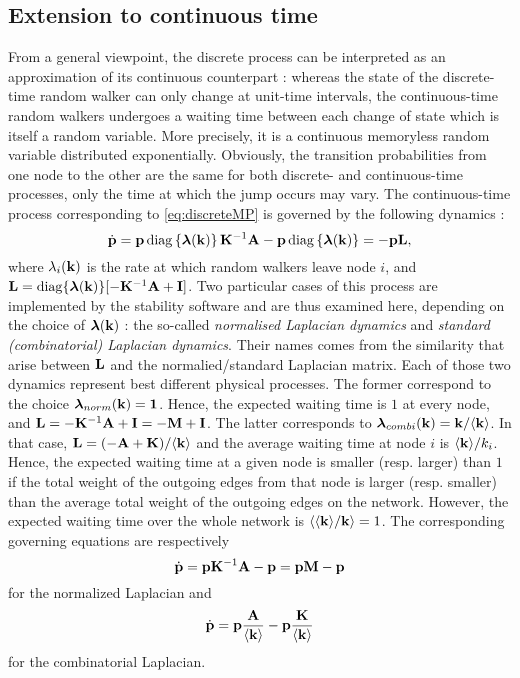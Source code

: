 \subsection{Extension to continuous time}
From a general viewpoint, the discrete process can be interpreted as an approximation of its continuous counterpart : whereas the state of the discrete-time random walker can only change at unit-time intervals, the continuous-time random walkers undergoes a waiting time between each change of state which is itself a random variable. More precisely, it is a continuous memoryless random variable distributed exponentially. Obviously, the transition probabilities from one node to the other are the same for both discrete- and continuous-time processes, only the time at which the jump occurs may vary. The continuous-time process corresponding to \eqref{eq:discreteMP} is governed by the following dynamics :
\begin{equation} \label{eq:continuousMP_general}
    	\dot{\mathbf p} = \mathbf p \operatorname{diag}\left\{\boldsymbol \lambda(\mathbf k)\right\} \mathbf K^{-1} \mathbf A - \mathbf p \operatorname{diag}\left\{\boldsymbol \lambda(\mathbf k)\right\} = -\mathbf p \mathbf L,
\end{equation}
where $\lambda_i(\mathbf k)$ is the rate at which random walkers leave node $i$, and $\mathbf L = \operatorname{diag}\{\boldsymbol \lambda(\mathbf k)\}[-\mathbf K^{-1} \mathbf A + \mathbf I]$. Two particular cases of this process are implemented by the stability software and are thus examined here, depending on the choice of $\boldsymbol \lambda(\mathbf k)$ : the so-called \textit{normalised Laplacian dynamics} and \textit{standard (combinatorial) Laplacian dynamics}. Their names comes from the similarity that arise between $\mathbf L$ and the normalied/standard Laplacian matrix. Each of those two dynamics represent best different physical processes. The former correspond to the choice $\boldsymbol \lambda_{norm}(\mathbf k) = \mathbf 1$. Hence, the expected waiting time is $1$ at every node, and $\mathbf L = -\mathbf K^{-1} \mathbf A + \mathbf I = -\mathbf M + \mathbf I$. The latter corresponds to $\boldsymbol \lambda_{combi}(\mathbf k) = \mathbf k/\langle \mathbf k \rangle$. In that case, $\mathbf L = (-\mathbf A + \mathbf K)/\langle \mathbf k \rangle$ and the average waiting time at node $i$ is $\langle \mathbf k \rangle/k_i$. Hence, the expected waiting time at a given node is smaller (resp. larger) than $1$ if the total weight of the outgoing edges from that node is larger (resp. smaller) than the average total weight of the outgoing edges on the network. However, the expected waiting time over the whole network is $\langle \langle \mathbf k \rangle/\mathbf k \rangle = 1$. The corresponding governing equations are respectively 
\begin{equation} \label{eq:continuousMP_norm}
	\dot{\mathbf p} = \mathbf p \mathbf K^{-1} \mathbf A - \mathbf p = \mathbf p \mathbf M - \mathbf p
\end{equation}
for the normalized Laplacian and
\begin{equation} \label{eq:continuousMP_combi}
    	\dot{\mathbf p} = \mathbf p \frac{\mathbf A}{\langle \mathbf k \rangle} - \mathbf p\frac{\mathbf K}{\langle \mathbf k \rangle}
\end{equation}
for the combinatorial Laplacian.


